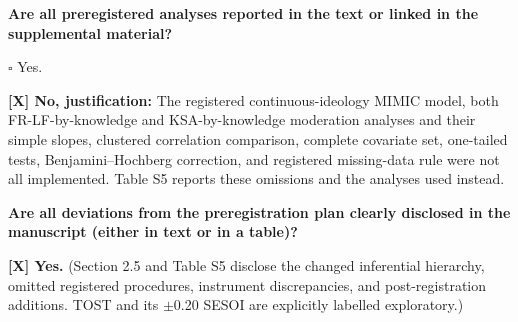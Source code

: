 \documentclass[
  12pt,
]{article}
\begin{document}
\bigskip

\textbf{Are all preregistered analyses reported in the text or linked in the supplemental material?}

\quad $\square$ Yes.

\textbf{[X] No, justification:} The registered continuous-ideology MIMIC model, both FR-LF-by-knowledge and
KSA-by-knowledge moderation analyses and their simple slopes, clustered
correlation comparison, complete covariate set, one-tailed tests,
Benjamini--Hochberg correction, and registered missing-data rule were not all
implemented. Table S5 reports these omissions and the analyses used instead.

\bigskip

\textbf{Are all deviations from the preregistration plan clearly disclosed in the manuscript (either in text or in a table)?}

\textbf{[X] Yes.} (Section 2.5 and Table S5 disclose the changed inferential hierarchy, omitted registered procedures, instrument discrepancies, and post-registration additions. TOST and its $\pm$0.20 SESOI are explicitly labelled exploratory.)
\end{document}
